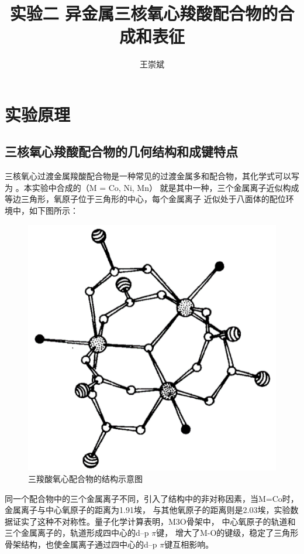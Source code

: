 \documentclass[a4paper,zihao=5,UTF8]{ctexart}
\title{\textbf{实验二 异金属三核氧心羧酸配合物的合成和表征\cite{inorganic_chemistry_1}}}
\author{王崇斌\;1800011716}
\begin{document}
	\pagestyle{fancy}
	\pagestyle{fancy}
	\chead{}
	\rhead{\today}
	\maketitle
    \thispagestyle{fancy}
	\section{实验原理}
	\subsection{三核氧心羧酸配合物的几何结构和成键特点}
	三核氧心过渡金属羧酸配合物是一种常见的过渡金属多和配合物，其化学式可以写为
	。本实验中合成的（M = Co, Ni, Mn）
	就是其中一种，三个金属离子近似构成等边三角形，氧原子位于三角形的中心，每个金属离子
	近似处于八面体的配位环境中，如下图所示：
	\begin{figure}[htbp]
		\centering
		\includegraphics[scale=0.9]{M3O.png}
		\caption{三羧酸氧心配合物的结构示意图}
	\end{figure}
	\par
	同一个配合物中的三个金属离子不同，引入了结构中的非对称因素，当M=Co时，金属离子与中心氧原子的距离为1.91埃，
	与其他氧原子的距离则是2.03埃，实验数据证实了这种不对称性。量子化学计算表明，M3O骨架中，
	中心氧原子的轨道和三个金属离子的，轨道形成四中心的d–p $\pi$键，
	增大了M-O的键级，稳定了三角形骨架结构，也使金属离子通过四中心的d–p $\pi$键互相影响。
\end{document}
